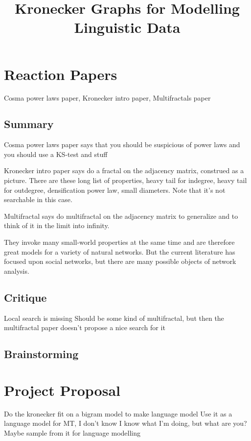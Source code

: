 \documentclass[12pt]{article}
\begin{document}
\title{Kronecker Graphs for Modelling Linguistic Data}

\section{Reaction Papers}

Cosma power laws paper, Kronecker intro paper, Multifractals paper

\subsection{Summary}
Cosma power laws paper says that you should be suspicious of power laws and you should use a KS-test and stuff

Kronecker intro paper says do a fractal on the adjacency matrix, construed as a picture. There are these long list of properties, heavy tail for indegree, heavy tail for outdegree, densification power law, small diameters. Note that it's not searchable in this case.

Multifractal says do multifractal on the adjacency matrix to generalize and to think of it in the limit into infinity.

They invoke many small-world properties at the same time and are therefore great models for a variety of natural networks. But the current literature has focused upon social networks, but there are many possible objects of network analysis.

\subsection{Critique}
Local search is missing
Should be some kind of multifractal, but then the multifractal paper doesn't propose a nice search for it
\subsection{Brainstorming}

\section{Project Proposal}
Do the kronecker fit on a bigram model to make language model
Use it as a language model for MT, I don't know
I know what I'm doing, but what are you?
Maybe sample from it for language modelling
\end{document}
